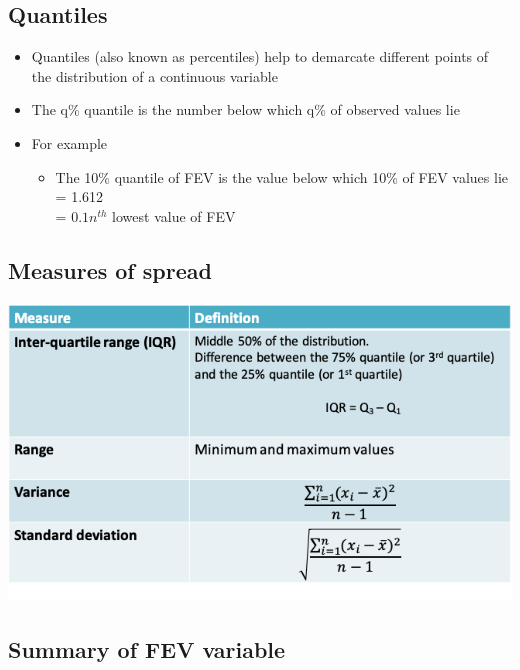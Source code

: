 \documentclass[
]{book}
\providecommand{\tightlist}{%
  \setlength{\itemsep}{0pt}\setlength{\parskip}{0pt}}
\begin{document}
\hypertarget{quantiles}{%
\subsection{Quantiles}\label{quantiles}}

\begin{itemize}
\tightlist
\item
  Quantiles (also known as percentiles) help to demarcate different points of the distribution of a continuous variable
\item
  The q\% quantile is the number below which q\% of observed values lie
\item
  For example

  \begin{itemize}
  \tightlist
  \item
    The 10\% quantile of FEV is the value below which 10\% of FEV values lie = 1.612\\
    = \(0.1n^{th}\) lowest value of FEV
  \end{itemize}
\end{itemize}

\hypertarget{measures-of-spread}{%
\subsection{Measures of spread}\label{measures-of-spread}}

\includegraphics[width=1\linewidth]{./3_12}

\hypertarget{summary-of-fev-variable-1}{%
\subsection{Summary of FEV variable}\label{summary-of-fev-variable-1}}
\end{document}
